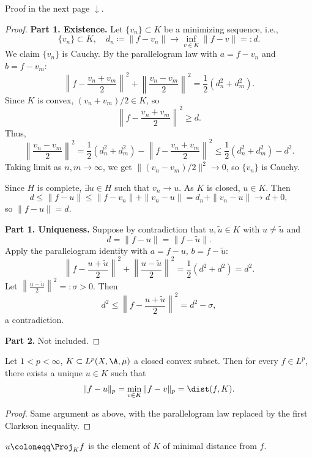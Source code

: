 Proof in the next page $\downarrow$.

\begin{proof}
\textbf{Part 1. Existence.}
Let $\{v_n\} \subset K$ be a minimizing sequence, i.e., 
\[
\{v_n\} \subset K, \quad d_n \coloneqq \|f - v_n\| \to \inf_{v \in K} \|f - v\| =: d.
\]
We claim $\{v_n\}$ is Cauchy. By the parallelogram law with $a = f - v_n$ and $b = f - v_m$:
\[
\left\| f - \frac{v_n + v_m}{2} \right\|^2 + \left\| \frac{v_n - v_m}{2} \right\|^2 = \frac{1}{2} (d_n^2 + d_m^2).
\]
Since $K$ is convex, $(v_n + v_m)/2 \in K$, so 
\[
\left\| f - \frac{v_n + v_m}{2} \right\|^2 \geq d.
\]
Thus,
\[
\left\| \frac{v_n - v_m}{2} \right\|^2 = \frac{1}{2} (d_n^2 + d_m^2) - \left\| f - \frac{v_n + v_m}{2} \right\|^2 \leq \frac{1}{2} (d_n^2 + d_m^2) - d^2.
\]
Taking limit as $n,m \to \infty$, we get $\|(v_n - v_m)/2\|^2 \to 0$, so $\{v_n\}$ is Cauchy.

Since $H$ is complete, $\exists u \in H$ such that $v_n \to u$. As $K$ is closed, $u \in K$. Then
\[
d \leq \|f - u\| \leq \|f - v_n\| + \|v_n - u\| = d_n + \|v_n - u\| \to d + 0,
\]
so $\|f - u\| = d$.

\textbf{Part 1. Uniqueness.}
Suppose by contradiction that $u, \tilde{u} \in K$ with $u \neq \tilde{u}$ and 
\[
d = \|f - u\| = \|f - \tilde{u}\|.
\]
Apply the parallelogram identity with $a = f - u$, $b = f - \tilde{u}$:
\[
\left\| f - \frac{u + \tilde{u}}{2} \right\|^2 + \left\| \frac{u - \tilde{u}}{2} \right\|^2 = \frac{1}{2} (d^2 + d^2) = d^2.
\]
Let $\left\| \frac{u - \tilde{u}}{2} \right\|^2 =: \sigma > 0$. Then
\[
d^2 \leq \left\| f - \frac{u + \tilde{u}}{2} \right\|^2 = d^2 - \sigma,
\]
a contradiction.

\textbf{Part 2.} Not included.
\end{proof}

\begin{theorem}[Projection in $L^p$]
Let $1 < p < \infty$, $K \subset L^p(X, \A, \mu)$ a closed convex subset. Then for every $f \in L^p$, there exists a unique $u \in K$ such that
\[
\|f - u\|_p = \min_{v \in K} \|f - v\|_p = \dist(f, K).
\]
\end{theorem}

\begin{proof}
Same argument as above, with the parallelogram law replaced by the first Clarkson inequality.
\end{proof}

\begin{definition}
$u \coloneqq \Proj_K f$ is the element of $K$ of minimal distance from $f$.
\end{definition}


